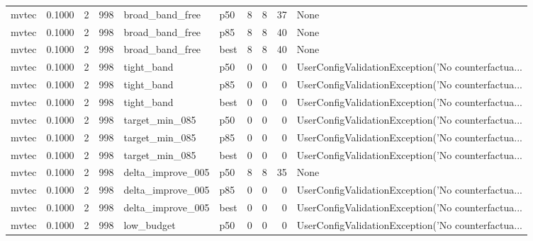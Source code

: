 \begin{tabular}{lrrrllrrrl}
   mvtec &    0.1000 &    2 &    998 &      broad\_band\_free &    p50 &               8 &          8 &      37 &                                               None \\
   mvtec &    0.1000 &    2 &    998 &      broad\_band\_free &    p85 &               8 &          8 &      40 &                                               None \\
   mvtec &    0.1000 &    2 &    998 &      broad\_band\_free &   best &               8 &          8 &      40 &                                               None \\
   mvtec &    0.1000 &    2 &    998 &           tight\_band &    p50 &               0 &          0 &       0 & UserConfigValidationException('No counterfactua... \\
   mvtec &    0.1000 &    2 &    998 &           tight\_band &    p85 &               0 &          0 &       0 & UserConfigValidationException('No counterfactua... \\
   mvtec &    0.1000 &    2 &    998 &           tight\_band &   best &               0 &          0 &       0 & UserConfigValidationException('No counterfactua... \\
   mvtec &    0.1000 &    2 &    998 &       target\_min\_085 &    p50 &               0 &          0 &       0 & UserConfigValidationException('No counterfactua... \\
   mvtec &    0.1000 &    2 &    998 &       target\_min\_085 &    p85 &               0 &          0 &       0 & UserConfigValidationException('No counterfactua... \\
   mvtec &    0.1000 &    2 &    998 &       target\_min\_085 &   best &               0 &          0 &       0 & UserConfigValidationException('No counterfactua... \\
   mvtec &    0.1000 &    2 &    998 &    delta\_improve\_005 &    p50 &               8 &          8 &      35 &                                               None \\
   mvtec &    0.1000 &    2 &    998 &    delta\_improve\_005 &    p85 &               0 &          0 &       0 & UserConfigValidationException('No counterfactua... \\
   mvtec &    0.1000 &    2 &    998 &    delta\_improve\_005 &   best &               0 &          0 &       0 & UserConfigValidationException('No counterfactua... \\
   mvtec &    0.1000 &    2 &    998 &           low\_budget &    p50 &               0 &          0 &       0 & UserConfigValidationException('No counterfactua... \\

\end{tabular}
